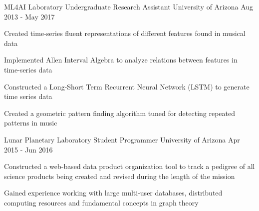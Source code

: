 \begin{cventries}
  \cventry
    {ML4AI Laboratory} %
    {Undergraduate Research Assistant} %
    {University of Arizona} %
    {Aug 2013 - May 2017} %
    {
      \begin{cvitems} %
        \item Created time-series fluent representations of different features found in musical data
        \item Implemented Allen Interval Algebra to analyze relations between features in time-series data
        \item Constructed a Long-Short Term Recurrent Neural Network (LSTM) to generate time series data
        \item Created a geometric pattern finding algorithm tuned for detecting repeated patterns in music
      \end{cvitems}
    }

  \cventry
    {Lunar Planetary Laboratory} %
    {Student Programmer} %
    {University of Arizona} %
    {Apr 2015 - Jun 2016} %
    {
      \begin{cvitems} %
        \item Constructed a web-based data product organization tool to track a pedigree of all science products being created and revised during the length of the mission
        \item Gained experience working with large multi-user databases, distributed computing resources and fundamental concepts in graph theory
      \end{cvitems}
    }


\end{cventries}
